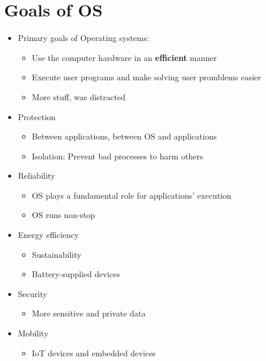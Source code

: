 \documentclass{article}
\begin{document}
\section{Goals of OS}
\begin{itemize}
    \item Primary goals of Operating systems:
        \begin{itemize}[-]
            \item Use the computer hardware in an \textbf{\color{blue!45!white}efficient} manner
            \item Execute user programs and make solving user promblems easier
            \item More stuff, was distracted
        \end{itemize}

    \item Protection
        \begin{itemize}[-]
            \item Between applications, between OS and applications
            \item Isolation: Prevent bad processes to harm others
        \end{itemize}
    \item Reliability
        \begin{itemize}[-]
            \item OS plays a fundamental role for applications' execution
            \item OS runs non-stop
        \end{itemize}
    \item Energy efficiency
        \begin{itemize}[-]
            \item Sustainability
            \item Battery-supplied devices
        \end{itemize}
    \item Security
        \begin{itemize}
            \item More sensitive and private data
        \end{itemize}
    \item Mobility
        \begin{itemize}[-]
            \item IoT devices and embedded devices
        \end{itemize}
\end{itemize}
\end{document}
